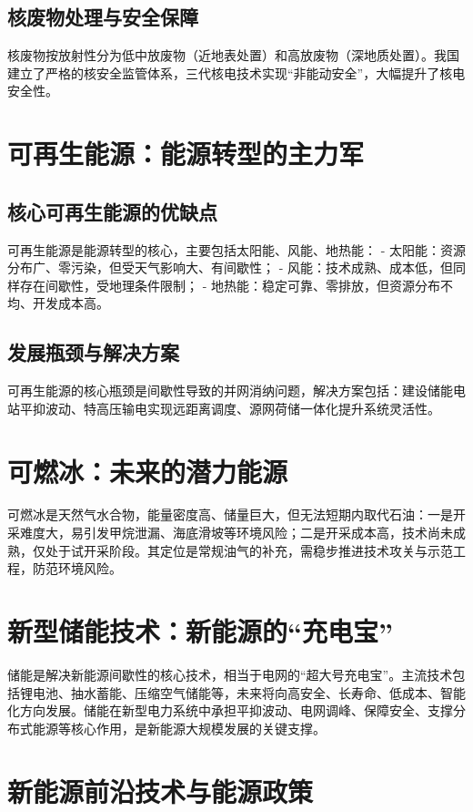 \documentclass[UTF8,a4paper,12pt]{article}
\begin{document}
\subsection{核废物处理与安全保障}
核废物按放射性分为低中放废物（近地表处置）和高放废物（深地质处置）。我国建立了严格的核安全监管体系，三代核电技术实现“非能动安全”，大幅提升了核电安全性。

\section{可再生能源：能源转型的主力军}
\subsection{核心可再生能源的优缺点}
可再生能源是能源转型的核心，主要包括太阳能、风能、地热能：
- 太阳能：资源分布广、零污染，但受天气影响大、有间歇性；
- 风能：技术成熟、成本低，但同样存在间歇性，受地理条件限制；
- 地热能：稳定可靠、零排放，但资源分布不均、开发成本高。

\subsection{发展瓶颈与解决方案}
可再生能源的核心瓶颈是间歇性导致的并网消纳问题，解决方案包括：建设储能电站平抑波动、特高压输电实现远距离调度、源网荷储一体化提升系统灵活性。

\section{可燃冰：未来的潜力能源}
可燃冰是天然气水合物，能量密度高、储量巨大，但无法短期内取代石油：一是开采难度大，易引发甲烷泄漏、海底滑坡等环境风险；二是开采成本高，技术尚未成熟，仅处于试开采阶段。其定位是常规油气的补充，需稳步推进技术攻关与示范工程，防范环境风险。

\section{新型储能技术：新能源的“充电宝”}
储能是解决新能源间歇性的核心技术，相当于电网的“超大号充电宝”。主流技术包括锂电池、抽水蓄能、压缩空气储能等，未来将向高安全、长寿命、低成本、智能化方向发展。储能在新型电力系统中承担平抑波动、电网调峰、保障安全、支撑分布式能源等核心作用，是新能源大规模发展的关键支撑。

\section{新能源前沿技术与能源政策}
\end{document}
